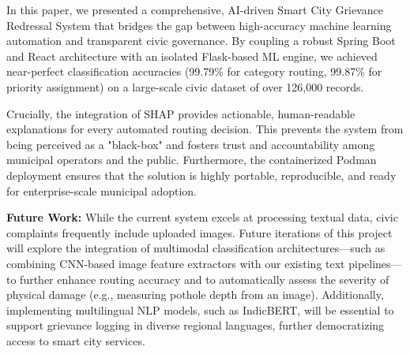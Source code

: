 \documentclass[conference]{IEEEtran}
\begin{document}
In this paper, we presented a comprehensive, AI-driven Smart City Grievance Redressal System that bridges the gap between high-accuracy machine learning automation and transparent civic governance. By coupling a robust Spring Boot and React architecture with an isolated Flask-based ML engine, we achieved near-perfect classification accuracies (99.79\% for category routing, 99.87\% for priority assignment) on a large-scale civic dataset of over 126,000 records. 

Crucially, the integration of SHAP provides actionable, human-readable explanations for every automated routing decision. This prevents the system from being perceived as a "black-box" and fosters trust and accountability among municipal operators and the public. Furthermore, the containerized Podman deployment ensures that the solution is highly portable, reproducible, and ready for enterprise-scale municipal adoption.

\textbf{Future Work:} While the current system excels at processing textual data, civic complaints frequently include uploaded images. Future iterations of this project will explore the integration of multimodal classification architectures—such as combining CNN-based image feature extractors with our existing text pipelines—to further enhance routing accuracy and to automatically assess the severity of physical damage (e.g., measuring pothole depth from an image). Additionally, implementing multilingual NLP models, such as IndicBERT, will be essential to support grievance logging in diverse regional languages, further democratizing access to smart city services.
\end{document}
